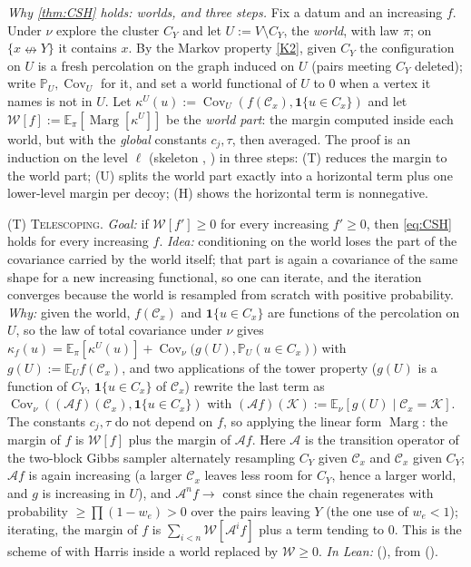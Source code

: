 \documentclass[11pt]{article}
\theoremstyle{definition}
\theoremstyle{remark}
\newcommand{\PP}{\mathbb{P}}
\newcommand{\E}{\mathbb{E}}
\DeclareMathOperator{\Cov}{Cov}
\newcommand{\ncon}{\nleftrightarrow}
\newcommand{\one}{\mathbf 1}
\newcommand{\eC}{\mathcal{C}}
\newcommand{\Marg}{\operatorname{Marg}}
\begin{document}
\emph{Why \cref{thm:CSH} holds: worlds, and three steps.}  Fix a datum and an increasing $f$.  Under $\nu$ explore the cluster $C_Y$ and let $U:=V\setminus C_Y$, the \emph{world}, with
law $\pi$; on $\{x\ncon Y\}$ it contains $x$.  By the Markov property \ref{K2}, given $C_Y$ the configuration on $U$ is a fresh percolation on the graph
induced on $U$ (pairs meeting $C_Y$ deleted); write $\PP_U,\Cov_U$ for it, and set a world functional of $U$ to $0$ when a vertex it names is not
in $U$.  Let $\kappa^U(u):=\Cov_U(f(\eC_x),\one\{u\in C_x\})$ and let $\mathcal W[f]:=\E_\pi[\Marg[\kappa^U]]$ be the
\emph{world part}: the margin computed inside each world, but with the \emph{global} constants $c_j,\tau$, then averaged.  The proof is an induction
on the level $\ell$ (skeleton , ) in three steps: (T) reduces the margin to
the world part; (U) splits the world part exactly into a horizontal term plus one lower-level margin per decoy; (H) shows the horizontal term is
nonnegative.

 \textsc{(T) Telescoping.}  \emph{Goal:} if $\mathcal W[f']\ge0$ for every increasing $f'\ge0$, then \eqref{eq:CSH} holds for every increasing $f$.
\emph{Idea:} conditioning on the world loses the part of the covariance carried by the world itself; that part is again a covariance of the same
shape for a new increasing functional, so one can iterate, and the iteration converges because the world is resampled from scratch with positive
probability.  \emph{Why:} given the world, $f(\eC_x)$ and $\one\{u\in C_x\}$ are functions of the percolation on $U$, so the law of total covariance under
$\nu$ gives $\kappa_f(u)=\E_\pi[\kappa^U(u)]+\Cov_\nu\bigl(g(U),\PP_U(u\in C_x)\bigr)$ with $g(U):=\E_Uf(\eC_x)$, and two applications of the tower
property ($g(U)$ is a function of $C_Y$, $\one\{u\in C_x\}$ of $\eC_x$) rewrite the last term as $\Cov_\nu((\mathcal Af)(\eC_x),\one\{u\in C_x\})$ with
$(\mathcal Af)(\mathcal K):=\E_\nu[g(U)\mid\eC_x=\mathcal K]$.  The constants $c_j,\tau$ do not depend on $f$, so applying the linear form $\Marg$:
the margin of $f$ is $\mathcal W[f]$ plus the margin of $\mathcal Af$.  Here $\mathcal A$ is the transition operator of the two-block Gibbs sampler
alternately resampling $C_Y$ given $\eC_x$ and $\eC_x$ given $C_Y$; $\mathcal Af$ is again increasing (a larger $\eC_x$ leaves less room for $C_Y$,
hence a larger world, and $g$ is increasing in $U$), and $\mathcal A^nf\to$ const since the chain regenerates with probability $\ge\prod(1-w_e)>0$
over the pairs leaving $Y$ (the one use of $w_e<1$); iterating, the margin of $f$ is $\sum_{i<n}\mathcal W[\mathcal A^if]$ plus a term tending
to $0$.  This is the scheme of \citep[proof of Thm.~2.1]{VandenbergHaggstromKahn2005} with Harris inside a world replaced by $\mathcal W\ge0$.
\emph{In Lean:}  (), from 
().
\end{document}
